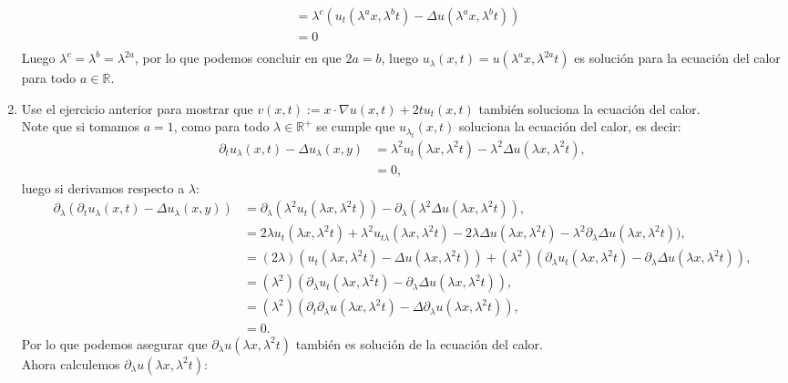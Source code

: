 \begin{homeworkProblem}
\begin{solucion}
\begin{enumerate}
\begin{align*}
          &=\lambda^c(u_{t}(\lambda^ax,\lambda^bt)-\Delta u(\lambda^ax,\lambda^bt))\\
          &=0\\
        \end{align*}
        Luego $\lambda^c=\lambda^b=\lambda^{2a}$, por lo que podemos concluir en que $2a=b$, luego $u_{\lambda}(x,t)=u(\lambda^{a}x,\lambda^{2a}t)$ es solución para la ecuación del calor para todo $a\in \mathbb{R}$.
        \demostrado
      \item Use el ejercicio anterior para mostrar que $v(x,t):=x\cdot \nabla u(x,t)+2tu_t(x,t)$ también soluciona la ecuación del calor.\\
        Note que si tomamos $a=1$, como para todo $\lambda\in\mathbb{R}^{+}$ se cumple que $u_{\lambda_{t}}(x,t)$ soluciona la ecuación del calor, es decir:
        \begin{align*}
          \partial_{t}u_{\lambda}(x,t)-\Delta u_{\lambda}(x,y)&=\lambda^2u_t(\lambda x,\lambda^2t)-\lambda^2\Delta u(\lambda x,\lambda^2 t),\\
          &=0,
        \end{align*}
        luego si derivamos respecto a $\lambda$:
        \begin{align*}
          \partial_{\lambda}(\partial_{t}u_{\lambda}(x,t)-\Delta u_{\lambda}(x,y))&=\partial_{\lambda}(\lambda^2u_t(\lambda x,\lambda^2t))-\partial_{\lambda}(\lambda^2\Delta u(\lambda x,\lambda^2 t)),\\
          &=2\lambda u_t(\lambda x,\lambda^2 t)+\lambda^2u_{t\lambda}(\lambda x,\lambda^2 t)-2\lambda\Delta u(\lambda x,\lambda^2 t)-\lambda^2\partial_{\lambda}\Delta u(\lambda x,\lambda^2 t)),\\
          &=(2\lambda)(u_t(\lambda x,\lambda^2 t)-\Delta u(\lambda x,\lambda^2 t))+(\lambda^2)(\partial_{\lambda}u_t(\lambda x,\lambda^2 t)-\partial_{\lambda}\Delta u(\lambda x,\lambda^2 t)),\\
          &=(\lambda^2)(\partial_{\lambda}u_t(\lambda x,\lambda^2 t)-\partial_{\lambda}\Delta u(\lambda x,\lambda^2 t)),\\
          &=(\lambda^2)(\partial_{t}\partial_{\lambda}u(\lambda x,\lambda^2 t)-\Delta \partial_{\lambda}u(\lambda x,\lambda^2 t)),\\
          &=0.
        \end{align*}
        Por lo que podemos asegurar que $\partial_{\lambda}u(\lambda x,\lambda^2 t)$ también es solución de la ecuación del calor.\\
        Ahora calculemos $\partial_{\lambda}u(\lambda x,\lambda^2 t)$:

\end{enumerate}
\end{solucion}
\end{homeworkProblem}
